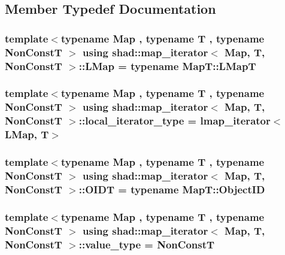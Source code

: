 \subsection{Member Typedef Documentation}
\hypertarget{classshad_1_1map__iterator_a157d8b69a2befd7e61c0df9eb52b2a71}{
\subsubsection[{L\-Map}]{\setlength{\rightskip}{0pt plus 5cm}template$<$typename Map , typename T , typename Non\-Const\-T $>$ using {\bf shad\-::map\-\_\-iterator}$<$ Map, T, Non\-Const\-T $>$\-::{\bf L\-Map} =  typename Map\-T\-::\-L\-Map\-T}}\label{classshad_1_1map__iterator_a157d8b69a2befd7e61c0df9eb52b2a71}
\hypertarget{classshad_1_1map__iterator_adceb72a3948aa860edd3a4c9ceca821d}{
\subsubsection[{local\-\_\-iterator\-\_\-type}]{\setlength{\rightskip}{0pt plus 5cm}template$<$typename Map , typename T , typename Non\-Const\-T $>$ using {\bf shad\-::map\-\_\-iterator}$<$ Map, T, Non\-Const\-T $>$\-::{\bf local\-\_\-iterator\-\_\-type} =  {\bf lmap\-\_\-iterator}$<${\bf L\-Map}, T$>$}}\label{classshad_1_1map__iterator_adceb72a3948aa860edd3a4c9ceca821d}
\hypertarget{classshad_1_1map__iterator_aecdaced930b9dcb48d5eff9ef992fbd5}{
\subsubsection[{O\-I\-D\-T}]{\setlength{\rightskip}{0pt plus 5cm}template$<$typename Map , typename T , typename Non\-Const\-T $>$ using {\bf shad\-::map\-\_\-iterator}$<$ Map, T, Non\-Const\-T $>$\-::{\bf O\-I\-D\-T} =  typename Map\-T\-::\-Object\-I\-D}}\label{classshad_1_1map__iterator_aecdaced930b9dcb48d5eff9ef992fbd5}
\hypertarget{classshad_1_1map__iterator_a77b746659dcccbde295013e95ac929bf}{
\subsubsection[{value\-\_\-type}]{\setlength{\rightskip}{0pt plus 5cm}template$<$typename Map , typename T , typename Non\-Const\-T $>$ using {\bf shad\-::map\-\_\-iterator}$<$ Map, T, Non\-Const\-T $>$\-::{\bf value\-\_\-type} =  Non\-Const\-T}}\label{classshad_1_1map__iterator_a77b746659dcccbde295013e95ac929bf}


